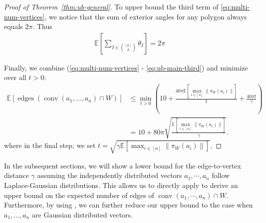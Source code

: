 \documentclass{article}\usepackage[a4paper,margin=20mm]{geometry}
\newcommand{\E}{\mathbb E}
\newcommand{\conv}{\operatorname{conv}}
\newcommand{\edges}{\operatorname{edges}}
\begin{document}
\begin{proof}[Proof of Theorem~\ref{thm:ub-general}]
    To upper bound the third term of \eqref{eq:multi-num-vertices}, we notice that the sum of exterior angles for any polygon always equals $2\pi$. Thus
    \begin{align}\label{eq:ub-main-third}
        \E[\sum_{I \in \binom{[n]}{d}} \theta_I] = 2\pi
    \end{align}
    
    Finally, we combine (\ref{eq:multi-num-vertices} - \ref{eq:ub-main-third}) and
    minimize over all $t > 0$:
    \begin{align*}
        \E\left[ \edges\left(\conv(a_1, \ldots, a_n) \cap W \right)  \right]
        &\leq \min_{t > 0} \left( 10 + \frac{40\pi \E[\max_{i\in [n]} \|\pi_W(a_i)\|]}{t}
        + \frac{40\pi t}{\gamma}  \right)\\
        &= 10 + 80\pi \sqrt{\frac{\E[\max_{i\in [n]} \|\pi_W(a_i)\|]}{\gamma}}.
    \end{align*}
    where in the final step, we set $t = \sqrt{\gamma \E[\max_{i\in [n]} \|\pi_W(a_i)\|]}$.
\end{proof}


In the subsequent sections, we will show a lower bound for the edge-to-vertex distance $\gamma$ assuming the independently distributed vectors $a_1, \cdots, a_n$ follow Laplace-Gaussian distributions. 
This allows us to directly apply  to derive an upper bound on the expected number of edges of $\conv(a_1, \cdots, a_n) \cap W$. 
Furthermore, by using , we can further reduce our upper bound to the case when $a_1, \dots, a_n$ are Gaussian distributed vectors.





\iffalse
\end{document}
